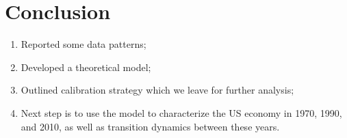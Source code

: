 \documentclass[onehalfspacing,11pt]{article}
\begin{document}


\section{Conclusion}\label{sec:conclusion}
\begin{enumerate}
    \item Reported some data patterns;
    \item Developed a theoretical model;
    \item Outlined calibration strategy which we leave for further analysis;
    \item Next step is to use the model to characterize the US economy in 1970, 1990, and 2010, as well as transition dynamics between these years.
\end{enumerate}



\newpage





\end{document}
